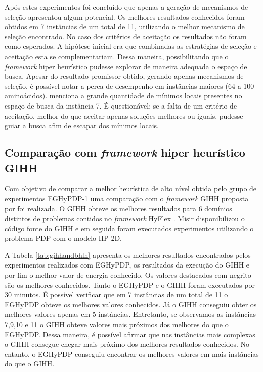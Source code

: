 	Após estes experimentos foi concluído que apenas a geração de mecanismos de seleção apresentou algum potencial. Os melhores resultados conhecidos foram obtidos em 7 instâncias de um total de 11, utilizando o melhor mecanismo de seleção encontrado. No caso dos critérios de aceitação os resultados não foram como esperados. A hipótese inicial era que combinadas as estratégias de seleção e aceitação esta se complementariam. Dessa maneira, possibilitando que o \textit{framework} hiper heurístico pudesse explorar de maneira adequada o espaço de busca. Apesar do resultado promissor obtido, gerando apenas mecanismos de seleção, é possível notar a perca de desempenho em instâncias maiores (64 a 100 aminoácidos). \cite{santana2008protein} menciona a grande quantidade de mínimos locais presentes no espaço de busca da instância 7. É questionável: se a falta de um critério de aceitação, melhor do que aceitar apenas soluções melhores ou iguais, pudesse guiar a busca afim de escapar dos mínimos locais. 

	
	
	\subsection{Comparação com \textit{framework} hiper heurístico GIHH}
	
	Com objetivo de comparar a melhor heurística de alto nível obtida pelo grupo de experimentos EGHyPDP-1 uma comparação com o \textit{framework} GIHH proposta por \cite{misir2012intelligent} foi realizada. O GIHH obteve os melhores resultados para 6  domínios distintos de problemas contidos no \textit{framework} HyFlex \cite{ochoa2012hyflex}. Misir disponibilizou o código fonte do GIHH e em seguida foram executados experimentos utilizando o problema PDP com o modelo HP-2D.
	
	A Tabela \ref{tab:gihhandbhlh} apresenta os melhores resultados encontrados pelos experimentos realizados com EGHyPDP, os resultados da execução do GIHH e por fim o melhor valor de energia conhecido. Os valores destacados com negrito são os melhores conhecidos. Tanto o EGHyPDP e o GIHH foram executados por 30 minutos. É possível verificar que em 7 instâncias de um total de 11 o EGHyPDP obteve os melhores valores conhecidos. Já o GIHH conseguiu obter os melhores valores apenas em 5 instâncias. Entretanto, se observamos as instâncias 7,9,10 e 11 o GIHH obteve valores mais próximos dos melhores do que o EGHyPDP. Dessa maneira, é possível afirmar que nas instâncias mais complexas o GIHH consegue chegar mais próximo dos melhores resultados conhecidos. No entanto, o EGHyPDP conseguiu encontrar os melhores valores em mais instâncias do que o GIHH. 
	
